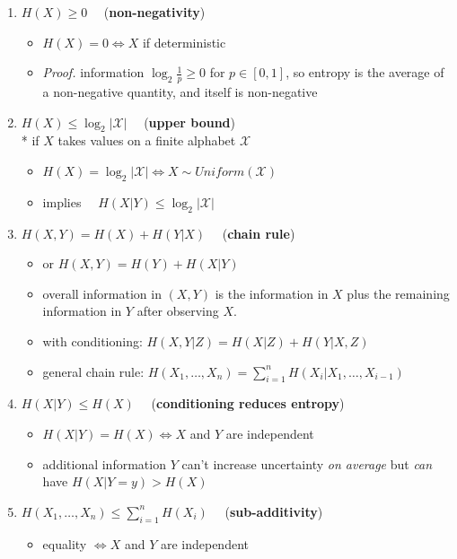 \documentclass[10pt, landscape]{article}
\begin{document}
\begin{multicols*}{4}
  \begin{enumerate}
    \item $H(X) \geq 0 \quad$ (\textbf{non-negativity})
      \begin{itemize}
        \item $H(X)=0 \iff X$ if deterministic
        \item \textit{Proof.} information $\log_2\frac{1}{p} \geq 0$ for $p \in [0,1]$, so entropy is the average of a non-negative quantity, and itself is non-negative
      \end{itemize}
    \item $H(X) \leq \log_2 \vert\mathcal{X}\vert \quad$ (\textbf{upper bound}) \\* if $X$ takes values on a finite alphabet $ \mathcal{X} $
      \begin{itemize}
        \item $H(X) = \log_2\vert \mathcal{X}\vert \iff X\sim Uniform(\mathcal{X})$
        \item implies $\quad H(X \vert Y) \leq \log_2 \vert \mathcal{X} \vert$
      \end{itemize}
    \item $H(X, Y) = H(X) + H(Y\vert X) \quad$ (\textbf{chain rule})
      \begin{itemize}
        \item or $H(X, Y) = H(Y) + H(X\vert Y)$
        \item overall information in $(X, Y)$ is the information in $X$ plus the remaining information in $Y$ after observing $X$.
        \item with conditioning: $H(X, Y \vert Z) = H(X \vert Z) + H(Y \vert X, Z)$
        \item general chain rule: $H(X_1, \dots, X_n) = \sum^n_{i=1} H(X_i \vert X_1, \dots, X_{i-1})$
      \end{itemize}
    \item $H(X \vert Y) \leq H(X) \quad$ (\textbf{conditioning reduces entropy})
      \begin{itemize}
        \item $H(X \vert Y) = H(X) \iff X$ and $Y$ are independent
        \item additional information $Y$ can't increase uncertainty \textit{on average}
          but \textit{can} have $H(X \vert Y=y) > H(X)$
      \end{itemize}
    \item $H(X_1, \dots, X_n) \leq \sum^n_{i=1} H(X_i) \quad$ (\textbf{sub-additivity})
      \begin{itemize}
        \item equality $\iff X$ and $Y$ are independent
      \end{itemize}
  \end{enumerate}


\end{multicols*}
\end{document}
